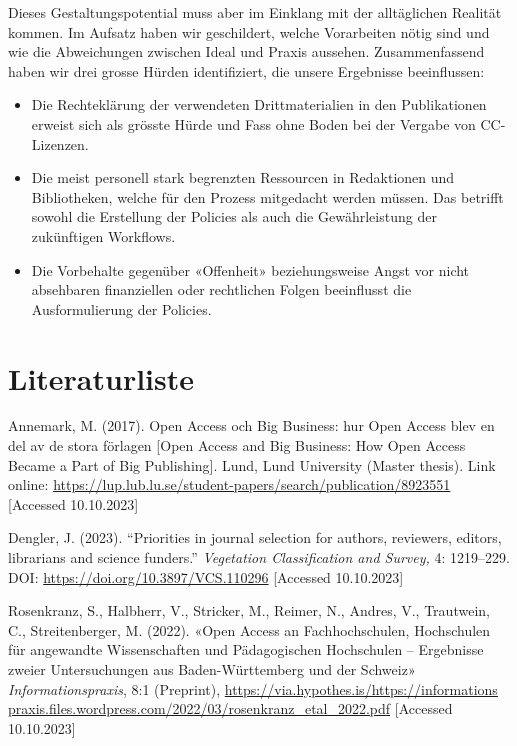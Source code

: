 \documentclass[a4paper,
fontsize=11pt,
oneside,
numbers=noperiodatend,
parskip=half-,
bibliography=totoc,
final
]{scrartcl}
\begin{document}
Dieses Gestaltungspotential muss aber im Einklang mit der alltäglichen
Realität kommen. Im Aufsatz haben wir geschildert, welche Vorarbeiten
nötig sind und wie die Abweichungen zwischen Ideal und Praxis aussehen.
Zusammenfassend haben wir drei grosse Hürden identifiziert, die unsere
Ergebnisse beeinflussen:

\begin{itemize}
\item
  Die Rechteklärung der verwendeten Drittmaterialien in den
  Publikationen erweist sich als grösste Hürde und Fass ohne Boden bei
  der Vergabe von CC-Lizenzen.
\item
  Die meist personell stark begrenzten Ressourcen in Redaktionen und
  Bibliotheken, welche für den Prozess mitgedacht werden müssen. Das
  betrifft sowohl die Erstellung der Policies als auch die
  Gewährleistung der zukünftigen Workflows.
\item
  Die Vorbehalte gegenüber «Offenheit» beziehungsweise Angst vor nicht
  absehbaren finanziellen oder rechtlichen Folgen beeinflusst die
  Ausformulierung der Policies.
\end{itemize}

\hypertarget{literaturliste}{%
\section{Literaturliste}\label{literaturliste}}

Annemark, M. (2017). Open Access och Big Business: hur Open Access blev
en del av de stora förlagen {[}Open Access and Big Business: How Open
Access Became a Part of Big Publishing{]}. Lund, Lund University
(Master thesis). Link online:
\url{https://lup.lub.lu.se/student-papers/search/publication/8923551}
{[}Accessed 10.10.2023{]}

Dengler, J. (2023). \enquote{Priorities in journal selection for
authors, reviewers, editors, librarians and science funders.}
\emph{Vegetation Classification and Survey,} 4: 1219--229. DOI:
\url{https://doi.org/10.3897/VCS.110296} {[}Accessed 10.10.2023{]}

Rosenkranz, S., Halbherr, V., Stricker, M., Reimer, N., Andres, V.,
Trautwein, C., Streitenberger, M. (2022). «Open Access an
Fachhochschulen, Hochschulen für angewandte Wissenschaften und
Pädagogischen Hochschulen -- Ergebnisse zweier Untersuchungen aus
Baden-Württemberg und der Schweiz» \emph{Informationspraxis}, 8:1
(Preprint),
\href{https://via.hypothes.is/https://informationspraxis.files.wordpress.com/2022/03/rosenkranz_etal_2022.pdf}{https://via.hypothes.is/https://informations praxis.files.wordpress.com/2022/03/rosenkranz\_etal\_2022.pdf}
{[}Accessed 10.10.2023{]}
\end{document}
